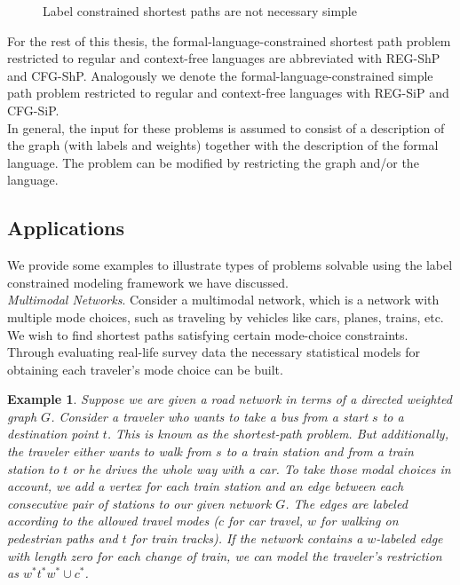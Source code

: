 \documentclass[]{article}
\newtheorem{example}[theorem]{Example}
\numberwithin{equation}{section}
\begin{document}
\begin{figure}[H]
	\centering
	\caption{Label constrained shortest paths are not necessary simple}
	\label{fig:spnotsimple}
\end{figure}

For the rest of this thesis, the formal-language-constrained shortest path problem restricted to regular and context-free languages are abbreviated with REG-ShP and CFG-ShP. Analogously we denote the formal-language-constrained simple path problem restricted to regular and context-free languages with REG-SiP and CFG-SiP.\\

In general, the input for these problems is assumed to consist of a description of the graph (with labels and weights) together with the description of the formal language. The problem can be modified by restricting the graph and/or the language.

\subsection{Applications}
\label{sec:found:app}
We provide some examples to illustrate types of problems solvable using the label constrained modeling framework we have discussed.\\

\noindent \textit{Multimodal Networks}. Consider a multimodal network, which is a network with multiple mode choices, such as traveling by vehicles like cars, planes, trains, etc. We wish to find shortest paths satisfying certain mode-choice constraints. Through evaluating real-life survey data the necessary statistical models for obtaining each traveler's mode choice can be built.

\begin{example}
	\label{ex:routing}
	 Suppose we are given a road network in terms of a directed weighted graph $G$. Consider a traveler who wants to take a bus from a start $s$ to a destination point $t$. This is known as the shortest-path problem. But additionally, the traveler either wants to walk from $s$ to a train station and from a train station to $t$ or he drives the whole way with a car. To take those modal choices in account, we add a vertex for each train station and an edge between each consecutive pair of stations to our given network $G$. The edges are labeled according to the allowed travel modes ($c$ for car travel, $w$ for walking on pedestrian paths and $t$ for train tracks). If the network contains a $w$-labeled edge with length zero for each change of train, we can model the traveler’s restriction as $w^*t^*w^*\cup c^*$.
\end{example}
\end{document}

